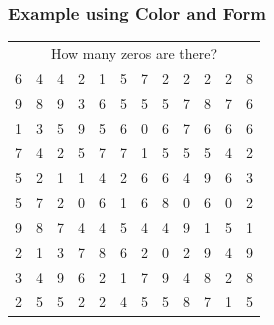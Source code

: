 \documentclass[10pt]{beamer}
\begin{document}
\begin{frame}
\frametitle{Example using Color and Form}
{\scriptsize
\begin{center}
\begin{tabular}{cccccccccccc}
\multicolumn{12}{c}{How many zeros are there?}\\
6     & 4    & 4    & 2    & 1    & 5    & 7    & 2    & 2    & 2    & 2    & 8    \\
9     & 8    & 9    & 3    & 6    & 5    & 5    & 5    & 7    & 8    & 7    & 6    \\
1     & 3    & 5    & 9    & 5    & 6    & 0    & 6    & 7    & 6    & 6    & 6    \\
7     & 4    & 2    & 5    & 7    & 7    & 1    & 5    & 5    & 5    & 4    & 2   \\
5     & 2    & 1    & 1    & 4    & 2    & 6    & 6    & 4    & 9    & 6    & 3    \\
5     & 7    & 2    & 0    & 6    & 1    & 6    & 8    & 0    & 6    & 0    & 2    \\
9     & 8    & 7    & 4    & 4    & 5    & 4    & 4    & 9    & 1    & 5    & 1    \\
2     & 1    & 3    & 7    & 8    & 6    & 2    & 0    & 2    & 9    & 4    & 9    \\
3     & 4    & 9    & 6    & 2    & 1    & 7    & 9    & 4    & 8    & 2    & 8    \\
2     & 5    & 5    & 2    & 2    & 4    & 5    & 5    & 8    & 7    & 1    & 5    \\
\end{tabular}
\end{center}
}


\end{frame}
\end{document}
